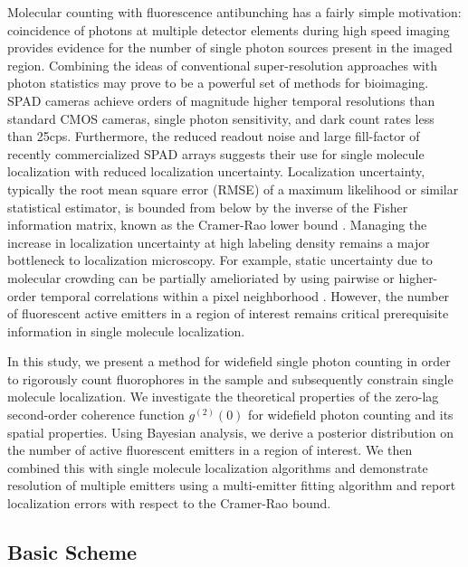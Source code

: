 \documentclass[a4paper, twocolumn, superscriptaddress,prl]{revtex4}  %
\begin{document}
Molecular counting with fluorescence antibunching has a fairly simple motivation: coincidence of photons at multiple detector elements during high speed imaging provides evidence for the number of single photon sources present in the imaged region. Combining the ideas of conventional super-resolution approaches with photon statistics may prove to be a powerful set of methods for bioimaging. SPAD cameras achieve orders of magnitude higher temporal resolutions than standard CMOS cameras, single photon sensitivity, and dark count rates less than 25cps. Furthermore, the reduced readout noise and large fill-factor of recently commercialized SPAD arrays suggests their use for single molecule localization with reduced localization uncertainty. Localization uncertainty, typically the root mean square error (RMSE) of a maximum likelihood or similar statistical estimator, is bounded from below by the inverse of the Fisher information matrix, known as the Cramer-Rao lower bound \citep{Chao2016}. Managing the increase in localization uncertainty at high labeling density remains a major bottleneck to localization microscopy. For example, static uncertainty due to molecular crowding can be partially amelioriated by using pairwise or higher-order temporal correlations within a pixel neighborhood \citep{Dertinger2009}. However, the number of fluorescent active emitters in a region of interest remains critical prerequisite information in single molecule localization.

In this study, we present a method for widefield single photon counting in order to rigorously count fluorophores in the sample and subsequently constrain single molecule localization. We investigate the theoretical properties of the zero-lag second-order coherence function $g^{(2)}(0)$ for widefield photon counting and its spatial properties. Using Bayesian analysis, we derive a posterior distribution on the number of active fluorescent emitters in a region of interest. We then combined this with single molecule localization algorithms and demonstrate resolution of multiple emitters using a multi-emitter fitting algorithm and report localization errors with respect to the Cramer-Rao bound.

\subsection{Basic Scheme}
\end{document}
